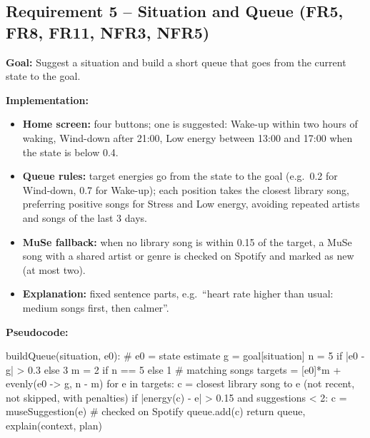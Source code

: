 \documentclass[conference]{IEEEtran}
\newcommand{\goal}[1]{\noindent\textbf{Goal:} #1\par\smallskip}
\newcommand{\impl}{\noindent\textbf{Implementation:}}
\newcommand{\pcode}{\noindent\textbf{Pseudocode:}}
\begin{document}
\subsection{Requirement 5 -- Situation and Queue (FR5, FR8, FR11, NFR3, NFR5)}
\goal{Suggest a situation and build a short queue that goes from the current state to the goal.}
\impl
\begin{itemize}
\item \textbf{Home screen:} four buttons; one is suggested: Wake-up within two hours of waking, Wind-down after 21:00, Low energy between 13:00 and 17:00 when the state is below 0.4.
\item \textbf{Queue rules:} target energies go from the state to the goal (e.g.\ 0.2 for Wind-down, 0.7 for Wake-up); each position takes the closest library song, preferring positive songs for Stress and Low energy, avoiding repeated artists and songs of the last 3 days.
\item \textbf{MuSe fallback:} when no library song is within 0.15 of the target, a MuSe song with a shared artist or genre is checked on Spotify and marked as new (at most two).
\item \textbf{Explanation:} fixed sentence parts, e.g.\ ``heart rate higher than usual: medium songs first, then calmer''.
\end{itemize}
\par\noindent\begin{minipage}{\columnwidth}
\pcode
\begin{code}
buildQueue(situation, e0):     # e0 = state estimate
  g = goal[situation]
  n = 5 if |e0 - g| > 0.3 else 3
  m = 2 if n == 5 else 1       # matching songs
  targets = [e0]*m + evenly(e0 -> g, n - m)
  for e in targets:
    c = closest library song to e
        (not recent, not skipped, with penalties)
    if |energy(c) - e| > 0.15 and suggestions < 2:
      c = museSuggestion(e)    # checked on Spotify
    queue.add(c)
  return queue, explain(context, plan)
\end{code}
\end{minipage}\par
\end{document}
